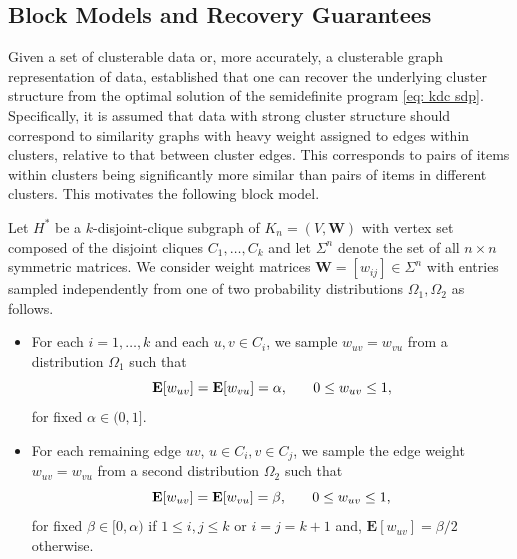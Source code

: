 \documentclass[twoside,11pt]{article}
\newcommand{\E}{\mathbf{E}}
\newcommand{\bs}{\boldsymbol}
\newcommand{\W}{\bs {W}}
\newcommand{\0}{\bs{0}}
\newcommand{\eq}[1]{\(#1\)}
\begin{document}
{\subsection{Block Models and Recovery Guarantees}
\label{sec: rec}
Given a set of {clusterable} data or, more accurately, a {clusterable} graph representation of data, \cite{ames2014guaranteed} established that one can recover the underlying cluster structure from the optimal solution of the semidefinite program \eqref{eq: kdc sdp}.
Specifically, it is assumed that data with strong cluster structure should correspond to similarity graphs
with heavy weight assigned to edges within clusters, relative to that between cluster edges.
This corresponds to pairs of items within clusters being significantly more similar than pairs of items in
different clusters. This motivates the following block model.

Let \(H^*\) be a \(k\)-disjoint-clique subgraph of \(K_n = (V,\W)\) with vertex set composed
of the disjoint cliques \(C_1, \dots, C_k\) and
let \(\Sigma^n\) denote the set of all \(n\times n\) symmetric matrices.
We consider weight matrices \(\W = [w_{ij}] \in \Sigma^n\)
with entries sampled independently from one of two probability distributions \(\Omega_1, \Omega_2\)
as follows. %
\begin{itemize}
	\item
	For each \(i=1, \dots, k\) and each \(u,v \in C_i\),
	we sample \(w_{uv} = w_{vu}\) from a distribution \(\Omega_1\) such that
	\[
	\E[w_{uv}] = \E [w_{vu}] = \alpha, \hspace{0.25in} 0 \le w_{uv} \le 1,
	\]
	for fixed \(\alpha \in (0,1]\).
	\item
	For each remaining 	edge \(uv\),
	\eq{u\in C_i, v \in C_j}, we sample the edge weight \(w_{uv} = w_{vu}\)
	from a second distribution \(\Omega_2\) such that
	\[
	\E[w_{uv}]  = \E[w_{vu}] = \beta, \hspace{0.25in} 0 \le w_{uv} \le 1,
	\]
	for fixed \(\beta \in [0, \alpha) \)
	if ${1 \le i, j \le k}$ or $i=j = k+1$
	and, \(\E[w_{uv}] = \beta/2\) otherwise.
\end{itemize}

}
\end{document}
